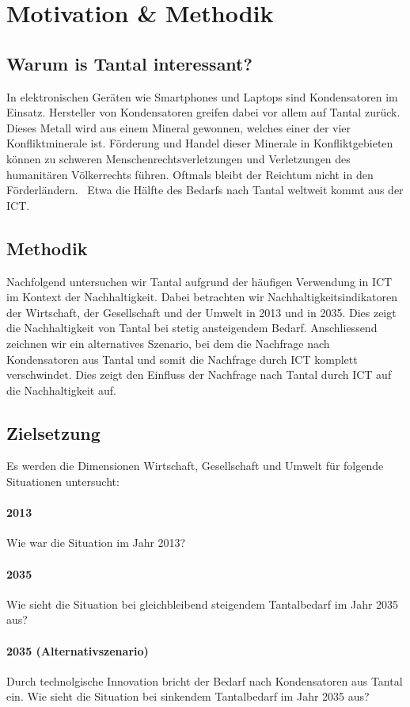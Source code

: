 \section{Motivation \& Methodik}\label{sec:motivation}

\subsection{Warum is Tantal interessant?}

In elektronischen Geräten wie Smartphones und Laptops sind Kondensatoren im Einsatz.
Hersteller von Kondensatoren greifen dabei vor allem auf Tantal zurück. Dieses Metall wird aus einem Mineral gewonnen, welches einer der vier Konfliktminerale ist.
Förderung und Handel dieser Minerale in Konfliktgebieten können zu schweren Menschenrechtsverletzungen und Verletzungen des humanitären Völkerrechts führen. Oftmals bleibt der Reichtum nicht in den Förderländern.~\cite{conflict_minerals}
Etwa die Hälfte des Bedarfs nach Tantal weltweit kommt aus der ICT.~\cite{why_tantal}

\subsection{Methodik}

Nachfolgend untersuchen wir Tantal aufgrund der häufigen Verwendung in ICT im Kontext der Nachhaltigkeit. Dabei betrachten wir Nachhaltigkeitsindikatoren der Wirtschaft, der Gesellschaft und der Umwelt in 2013 und in 2035. Dies zeigt die Nachhaltigkeit von Tantal bei stetig ansteigendem Bedarf.
Anschliessend zeichnen wir ein alternatives Szenario, bei dem die Nachfrage nach Kondensatoren aus Tantal und somit die Nachfrage durch ICT komplett verschwindet. Dies zeigt den Einfluss der Nachfrage nach Tantal durch ICT auf die Nachhaltigkeit auf.

\subsection{Zielsetzung}

Es werden die Dimensionen Wirtschaft, Gesellschaft und Umwelt für folgende Situationen untersucht:

\paragraph{2013}
Wie war die Situation im Jahr 2013?
\paragraph{2035}
Wie sieht die Situation bei gleichbleibend steigendem Tantalbedarf im Jahr 2035 aus?
\paragraph{2035 (Alternativszenario)}
Durch technolgische Innovation bricht der Bedarf nach Kondensatoren aus Tantal ein. Wie sieht die Situation bei sinkendem Tantalbedarf im Jahr 2035 aus?
